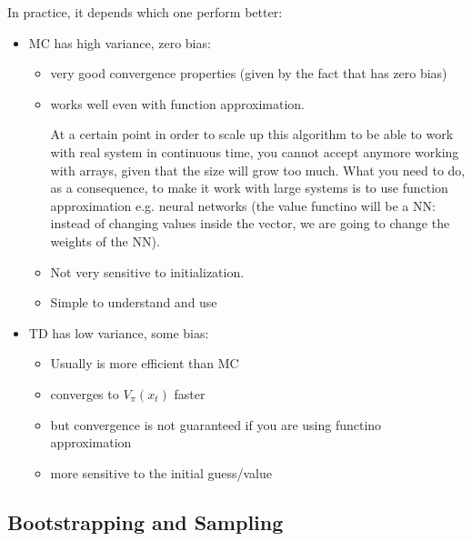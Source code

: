 In practice, it depends which one perform better:
\begin{itemize}
\item MC has high variance, zero bias:
\begin{itemize}
\item very good convergence properties (given by the fact that has zero bias)
\item works well even with function approximation.

At a certain point in order to scale up this algorithm to be able to work with real system in continuous time, you cannot accept anymore working with arrays, given that the size will grow too much. What you need to do, as a consequence, to make it work with large systems is to use function approximation e.g. neural networks (the value functino will be a NN: instead of changing values inside the vector, we are going to change the weights of the NN).
\item Not very sensitive to initialization.
\item Simple to understand and use
\end{itemize}
\item TD has low variance, some bias:
\begin{itemize}
\item Usually is more efficient than MC
\item converges to $V_{\pi}(x_t)$ faster
\item but convergence is not guaranteed if you are using functino approximation
\item more sensitive to the initial guess/value
\end{itemize}
\end{itemize}


\subsection{Bootstrapping and Sampling}

